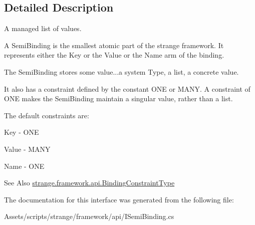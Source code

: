 \subsection{Detailed Description}
A managed list of values. 

A Semi\-Binding is the smallest atomic part of the strange framework. It represents either the Key or the Value or the Name arm of the binding. \par
 The Semi\-Binding stores some value...a system Type, a list, a concrete value. \par
 It also has a constraint defined by the constant O\-N\-E or M\-A\-N\-Y. A constraint of O\-N\-E makes the Semi\-Binding maintain a singular value, rather than a list. \par
 The default constraints are\-: 
\begin{DoxyItemize}
\item Key -\/ O\-N\-E 
\item Value -\/ M\-A\-N\-Y 
\item Name -\/ O\-N\-E 
\end{DoxyItemize}

\begin{DoxySeeAlso}{See Also}
\hyperlink{namespacestrange_1_1framework_1_1api_a9819c5ab6d03a2cbce2d3dddf5264e42}{strange.\-framework.\-api.\-Binding\-Constraint\-Type} 
\end{DoxySeeAlso}


The documentation for this interface was generated from the following file\-:\begin{DoxyCompactItemize}
\item 
Assets/scripts/strange/framework/api/I\-Semi\-Binding.\-cs\end{DoxyCompactItemize}
